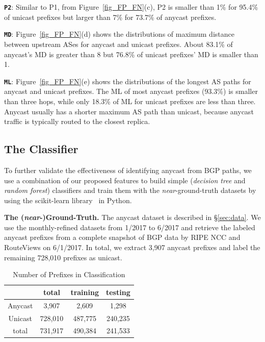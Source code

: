 \vspace{2pt}
\textbf{\texttt{P2}}: 
Similar to P1, from Figure~\ref{fig_FP_FN}(c), P2 is smaller than 1\% for 95.4\% of unicast prefixes but larger than 7\% for 73.7\% of anycast prefixes. 

\vspace{2pt}
\textbf{\texttt{MD}}:
Figure~\ref{fig_FP_FN}(d) shows the distributions of maximum distance between
upstream ASes for anycast and unicast prefixes. About 83.1\% of anycast's MD is
greater than 8 but 76.8\% of unicast prefixes' MD is smaller than 1. 

\vspace{2pt}
\textbf{\texttt{ML}}: 
Figure~\ref{fig_FP_FN}(e) shows the distributions of the longest AS paths for anycast and unicast prefixes. The ML of most anycast prefixes (93.3\%) is smaller than three hops, while only 18.3\% of ML for unicast prefixes are less than three. Anycast usually has a shorter maximum AS path than unicast, because anycast traffic is typically routed to the closest replica.

\subsection{The Classifier}

To further validate the effectiveness of identifying anycast from BGP paths, we
use a combination of our proposed features to build simple  (\textit{decision tree} and \textit{random forest}) classifiers and train them with the \textit{near}-ground-truth datasets by using the scikit-learn library~\cite{Scikit-learn} in Python. 

\vspace{2pt}
\textbf{The (\textit{near}-)Ground-Truth. }
The anycast dataset is described in \S\ref{sec:data}.  We use the monthly-refined datasets from 1/2017 to 6/2017 and retrieve the labeled anycast prefixes from a complete snapshot of BGP data by RIPE NCC and RouteViews on 6/1/2017. In total, we extract 3,907 anycast prefixes and label the remaining 728,010 prefixes as unicast.

\begin{table}[t]
\caption{Number of Prefixes in Classification}
\renewcommand{\arraystretch}{0.85}
\small
\begin{center}
\begin{tabular}{c c c c}
\toprule 
        & total & training & testing \\
\midrule 
Anycast & 3,907 & 2,609 & 1,298 \\
Unicast & 728,010 & 487,775 & 240,235  \\
total & 731,917 & 490,384  & 241,533 \\
\bottomrule
\end{tabular} 
\label{num_prefix_class}
\end{center}
\vspace{-3pt}
\end{table}

